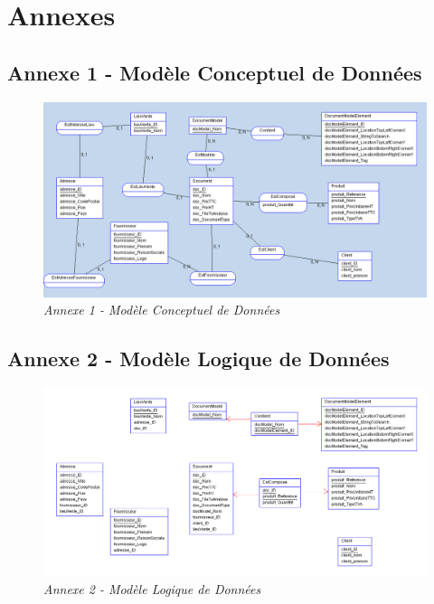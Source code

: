 \chapter{Annexes}

\section{Annexe 1 - Modèle Conceptuel de Données}

\begin{figure}[h]
	\begin{center}
		\includegraphics[scale = 0.37]{img/mcd.png}
	\end{center}
	\caption{\it Annexe 1 - Modèle Conceptuel de Données}
	\label{mcd}
\end{figure}

\newpage

\section{Annexe 2 - Modèle Logique de Données}

\begin{figure}[h]
	\begin{center}
		\includegraphics[scale = 0.37]{img/mld.png}
	\end{center}
	\caption{\it Annexe 2 - Modèle Logique de Données}
	\label{mld}
\end{figure}
